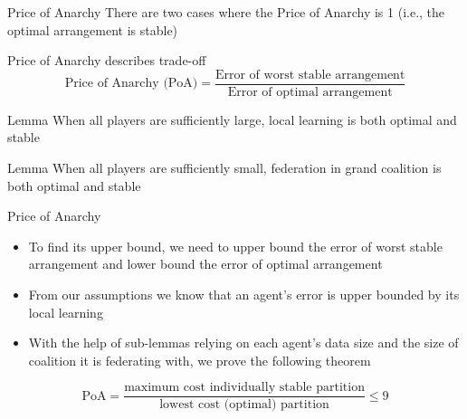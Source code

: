 \documentclass[aspectratio=169]{beamer}
\begin{document}
\begin{frame}[label={sec:orgeb6cb62}]{Price of Anarchy}
There are two cases where the Price of Anarchy is 1 (i.e., the optimal arrangement is stable)
\begin{definition}\label{sec:orgd9785ec}
Price of Anarchy describes trade-off 
\[\text{Price of Anarchy (PoA)} = \frac{\text{Error of worst stable arrangement}}{\text{Error of optimal arrangement}}\]
\end{definition}

\begin{block}{Lemma}
When all players are \alert{sufficiently large}, local learning is both optimal and stable
\end{block}

\begin{block}{Lemma}
When all players are \alert{sufficiently small}, federation in grand coalition is both optimal and stable
\end{block}
\end{frame}

\begin{frame}[label={sec:org0ba81f0}]{Price of Anarchy}
\begin{itemize}
\item To find its upper bound, we need to upper bound the error of worst stable arrangement and lower bound the error of optimal arrangement
\item From our assumptions we know that an agent's error is upper bounded by its local learning
\item With the help of sub-lemmas relying on each agent's data size and the size of coalition it is federating with, we prove the following theorem
\end{itemize}
\begin{theorem}\label{sec:org8b95283}
\[ \text{PoA} = \frac{\text{maximum cost individually stable partition}}{\text{lowest cost (optimal) partition}} \leq 9\]
\end{theorem}
\end{frame}
\end{document}
